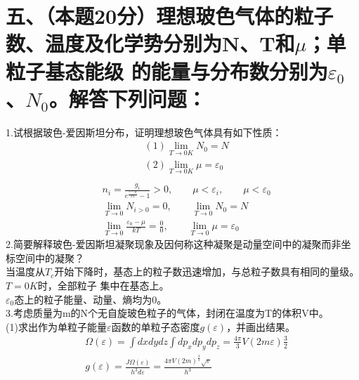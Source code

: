 \documentclass[UTF8]{ctexart}
\begin{document}
\section*{五、（本题20分）理想玻色气体的粒子数、温度及化学势分别为N、T和$\mu$；单粒子基态能级
  的能量与分布数分别为$\varepsilon_0$、$N_0$。解答下列问题：}
1.试根据玻色-爱因斯坦分布，证明理想玻色气体具有如下性质：
\begin{equation*}
  \begin{aligned}
     & (1)\lim_{T\to0K}N_0=N             \\
     & (2)\lim_{T\to0K}\mu=\varepsilon_0 \\
  \end{aligned}
\end{equation*}
\newline
\begin{equation*}
  \begin{aligned}
     & n_i=\frac{g_i}{e^\frac{\varepsilon-\mu}{kT}-1}>0,\quad\quad
    \mu<\varepsilon_i,\quad\quad\mu<\varepsilon_0                      \\
     & \lim_{T\to0}N_{i>0}=0,\quad\quad\lim_{T\to0}N_0=N               \\
     & \lim_{T\to0}\frac{\varepsilon_0-\mu}{kT}=\frac{0}{0},\quad\quad
    \lim_{T\to0}\mu=\varepsilon_0
  \end{aligned}
\end{equation*}
2.简要解释玻色-爱因斯坦凝聚现象及因何称这种凝聚是动量空间中的凝聚而非坐标空间中的凝聚？\\
当温度从$T_c$开始下降时，基态上的粒子数迅速增加，与总粒子数具有相同的量级。$T=0K$时，全部粒子
集中在基态上。\\
$\varepsilon_0$态上的粒子能量、动量、熵均为0。\\
3.考虑质量为m的N个无自旋玻色粒子的气体，封闭在温度为T的体积V中。\\
(1)求出作为单粒子能量$\varepsilon$函数的单粒子态密度$g(\varepsilon)$，并画出结果。\\
\begin{equation*}
  \begin{aligned}
     & \Omega(\varepsilon)=\int dxdydz\int dp_xdp_ydp_z=\frac{4\pi}{3}V(2m\varepsilon)\frac{3}{2} \\
     & g(\varepsilon)=\frac{J\Omega(\varepsilon)}{h^3d\varepsilon}
    =\frac{4\pi V(2m)^\frac{3}{2}\sqrt{\varepsilon}}{h^3}                                         \\
  \end{aligned}
\end{equation*}
\end{document}
